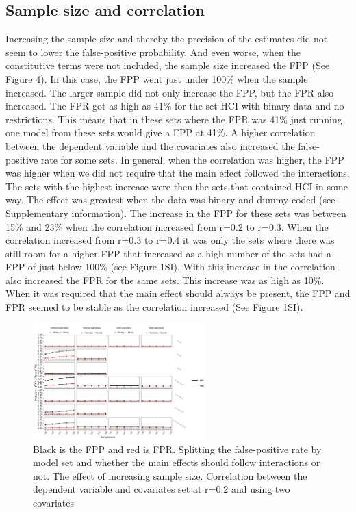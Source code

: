 \subsection{Sample size and correlation}
Increasing the sample size and thereby the precision of the estimates did not seem to lower the false-positive probability. And even worse, when the constitutive terms were not included, the sample size increased the FPP (See Figure 4). In this case, the FPP went just under 100\% when the sample increased. The larger sample did not only increase the FPP, but the FPR also increased. The FPR got as high as 41\% for the set HCI with binary data and no restrictions. This means that in these sets where the FPR was 41\% just running one model from these sets would give a FPP at 41\%. 
A higher correlation between the dependent variable and the covariates also increased the false-positive rate for some sets. In general, when the correlation was higher, the FPP was higher when we did not require that the main effect followed the interactions. The sets with the highest increase were then the sets that contained HCI in some way. The effect was greatest when the data was binary and dummy coded (see Supplementary information). The increase in the FPP for these sets was between 15\% and 23\% when the correlation increased from r=0.2 to r=0.3. When the correlation increased from r=0.3 to r=0.4 it was only the sets where there was still room for a higher FPP that increased as a high number of the sets had a FPP of just below 100\% (see Figure 1SI). With this increase in the correlation also increased the FPR for the same sets. This increase was as high as 10\%. When it was required that the main effect should always be present, the FPP and FPR seemed to be stable as the correlation increased (See Figure 1SI).

\begin{figure}[t]
\includegraphics[width=0.6\textwidth]{R/Analysis/Result/Figures/Figure1D.jpeg}
\centering
\caption{Black is the FPP and red is FPR.  Splitting the false-positive rate by model set and whether the main effects should follow interactions or not. The effect of increasing sample size. Correlation between the dependent variable and covariates set at r=0.2 and using two covariates}
\label{fig:mainfigure}
\end{figure}
